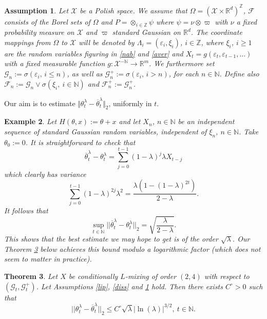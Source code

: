 \documentclass[a4paper,draft]{article}
\newtheorem{theorem}{Theorem}[section]
\newtheorem{example}[theorem]{Example}
\newtheorem{assumption}[theorem]{Assumption}
\begin{document}
\begin{assumption}\label{opa}
Let $\mathcal{X}$ be a Polish space.
We assume that $\Omega=(\mathcal{X}\times \mathbb{R}^d)^{\mathbb{Z}}$, $\mathcal{F}$ consists of the Borel sets of $\Omega$ and
$P=\otimes_{i\in\mathbb{Z}} \psi$ where $\psi=\nu\otimes\varpi$ with $\nu$ a fixed probability measure on $\mathcal{X}$ and $\varpi$ standard Gaussian
on $\mathbb{R}^d$.
The coordinate mappings from $\Omega$ to $\mathcal{X}$ will be denoted by $\Lambda_i=(\varepsilon_i,\xi_i)$, $i\in\mathbb{Z}$, where
$\xi_i$, $i\geq 1$ are the random variables figuring in \eqref{nab} and
\eqref{aver} and $X_t=g(\varepsilon_t,\varepsilon_{t-1},\ldots)$
with a fixed measurable function $g:\mathcal{X}^{-\mathbb{N}}\to\mathbb{R}^m$.
We furthermore set
$\mathcal{G}_n:=\sigma(\varepsilon_i,\, i\leq n)$, as well as $\mathcal{G}^+_n:=\sigma(\varepsilon_i,\, i>n)$,
for each $n\in\mathbb{N}$. Define also $\mathcal{F}_n:=\mathcal{G}_n\vee
\sigma(\xi_i,\ i\in\mathbb{N})$ and $\mathcal{F}_n^+:=\mathcal{G}_n^+$.
\end{assumption}



Our aim is to estimate
$\Vert\theta^{\lambda}_t-\overline{\theta}^{\lambda}_t\Vert_2$,
uniformly in $t$.

\begin{example} {\rm Let $H(\theta,x):=\theta+x$ and let $X_n$, $n\in\mathbb{N}$
be an independent sequence of standard Gaussian random variables,
independent of $\xi_n$, $n\in\mathbb{N}$. Take $\theta_0:=0$.
It is straightforward to check that
$$
\overline{\theta}^{\lambda}_t-\theta^{\lambda}_t=\sum_{j=0}^{t-1}
(1-\lambda)^j \lambda X_{t-j}
$$
which clearly has variance
$$
\sum_{j=0}^{t-1}(1-\lambda)^{2j}\lambda^2=\frac{\lambda(1-(1-\lambda)^{2t})}
{2-\lambda}.
$$
It follows that
$$
\sup_{t\in\mathbb{N}}||\overline{\theta}^{\lambda}_t-\theta^{\lambda}_t||_2=\sqrt{\frac{\lambda}{2-\lambda}}.
$$
This shows that the best estimate we may hope to get is of the
order $\sqrt{\lambda}$.
Our Theorem \ref{main} below achieves this bound modulo a logarithmic
factor (which does not seem to matter in practice).}
\end{example}

\begin{theorem}\label{main} Let $X$ be conditionally $L$-mixing
of order $(2,4)$ with respect to $(\mathcal{G}_t,\mathcal{G}_t^+)$.
Let Assumptions \ref{lip}, \ref{diss} and
\ref{opa} hold. Then there exists $C^{\circ}>0$ such that
\begin{equation}
||\theta^{\lambda}_t-\overline{\theta}^{\lambda}_t||_2
\leq C^{\circ}\sqrt{\lambda}|\ln(\lambda)|^{3/2},\ t\in\mathbb{N}.
\end{equation}
\end{theorem}
\end{document}
